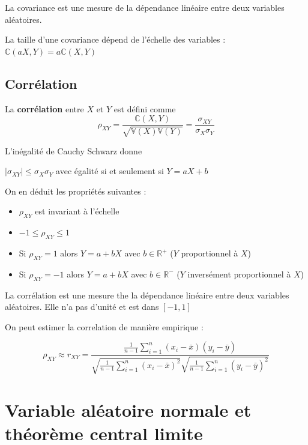 \documentclass[12pt,a4paper]{article}
\begin{document}
\medskip

La covariance est une mesure de la dépendance linéaire entre deux variables aléatoires.

La taille d'une covariance dépend de l'échelle des variables : $\mathbb{C}(aX,Y) = a\mathbb{C}(X,Y)$

\subsection{Corrélation}

La \textbf{corrélation} entre $X$ et $Y$ est défini comme
$$\rho_{XY} = \frac{\mathbb{C}(X,Y)}{\sqrt{\mathbb{V}(X)\mathbb{V}(Y)}} = \frac{\sigma_{XY}}{\sigma_X \sigma_Y}$$

\medskip

L'inégalité de Cauchy Schwarz donne

$|\sigma_{XY}| \leq \sigma_X \sigma_Y$ avec égalité si et seulement si $Y = aX + b$

On en déduit les propriétés suivantes :

\begin{itemize}
    \item $\rho_{XY}$ est invariant à l'échelle
    \item $-1 \leq \rho_{XY} \leq 1$
    \item Si $\rho_{XY} = 1$ alors $Y = a + bX$ avec $b \in \mathbb{R}^+$ ($Y$ proportionnel à $X$)
    \item Si $\rho_{XY} = -1$ alors $Y = a + bX$ avec $b \in \mathbb{R}^-$ ($Y$ inversément proportionnel à $X$)
\end{itemize}

\medskip

La corrélation est une mesure the la dépendance linéaire entre deux variables aléatoires. Elle n'a pas d'unité et est dans $[-1,1]$

\medskip

On peut estimer la correlation de manière empirique :

$$\rho_{XY} \approx r_{XY} = \frac{\frac{1}{n-1} \sum_{i=1}^n (x_i - \bar{x})(y_i - \bar{y})}{\sqrt{\frac{1}{n-1} \sum_{i=1}^n (x_i - \bar{x})^2} \sqrt{\frac{1}{n-1} \sum_{i=1}^n (y_i - \bar{y})^2}}$$


\break

\section{Variable aléatoire normale et théorème central limite}
\end{document}
